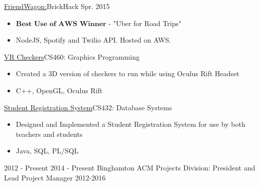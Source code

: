 \documentclass[11pt]{article}
\begin{document}
\headedsubsection
{\href{https://github.com/alanplotko/RoadTrip}{FriendWagon:}}{BrickHack Spr. 2015}
{
    \begin{itemize}[label={}]
    	\setlength\itemsep{.005ex}
        \item{$\textbf{Best Use of AWS Winner}$ - "Uber for Road Trips"}
        \item{NodeJS, Spotify and Twilio API. Hosted on AWS.}
    \end{itemize}
}

\headedsubsection
{\href{}{VR Checkers}}{CS460: Graphics Programming}
{
    \begin{itemize}[label={}]
    	\setlength\itemsep{.005ex}
        \item{Created a 3D version of checkers to run while using Oculus Rift Headset}
        \item{C++, OpenGL, Oculus Rift}
    \end{itemize}
}
\headedsubsection
{\href{}{Student Registration System}}{CS432: Database Systems}
{
    \begin{itemize}[label={}]
    	\setlength\itemsep{.005ex}
        \item{Designed and Implemented a Student Registration System for use by both teachers and students}
        \item{Java, SQL, PL/SQL}
    \end{itemize}
}
\spacedhrule{0.1em}{0.3em}  %

{2012 - Present}
{2014 - Present}
\inlineheadsection
{Binghamton ACM Projects Division: President and Lead Project Manager}
{2012-2016}
\end{document}
